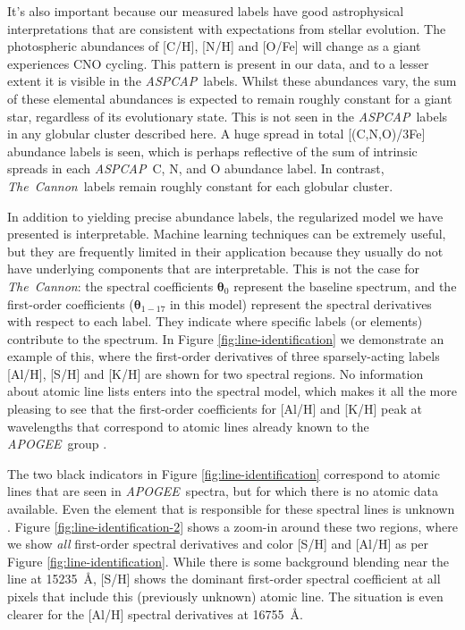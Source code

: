 \documentclass[12pt,preprint]{aastex}
\newcommand{\project}[1]{\textsl{#1}}
\newcommand{\TheCannon}{\project{The~Cannon}}
\newcommand{\acronym}[1]{{\small{#1}}}
\newcommand{\apogee}{\project{\acronym{APOGEE}}}
\newcommand{\aspcap}{\project{\acronym{ASPCAP}}}
\newcommand{\Dvector}[1]{\boldsymbol{#1}}
\newcommand{\vectheta}{\Dvector{\theta}}
\begin{document}
It's also important because our measured labels have good astrophysical
interpretations that are consistent with expectations from stellar
evolution.  The photospheric abundances of [C/H], [N/H] and [O/Fe] 
will change as a giant experiences CNO cycling.  This pattern is
present in our data, and to a lesser extent it is visible in the
\aspcap\ labels.  Whilst these abundances vary, the sum of these
elemental abundances is expected to remain roughly constant for a
giant star, regardless of its evolutionary state.  This is not 
seen in the \aspcap\ labels in any globular cluster described here.  
A huge spread in total [(C,N,O)/3Fe] abundance labels is seen, 
which is perhaps reflective of the sum of intrinsic spreads in
each \aspcap\ C, N, and O abundance label.  In contrast, \TheCannon\
labels remain roughly constant for each globular cluster.


In addition to yielding precise abundance labels, the regularized model
we have presented is interpretable.  Machine learning techniques can be extremely
useful, but they are frequently limited in their application because they
usually do not have underlying components that are interpretable.  This is
not the case for \TheCannon: the spectral coefficients $\vectheta_0$
represent the baseline spectrum, and the first-order coefficients 
($\vectheta_{1-17}$ in this model) represent the spectral derivatives with
respect to each label.  They indicate where specific labels (or elements)
contribute to the spectrum.  In Figure \ref{fig:line-identification} we
demonstrate an example of this, where the first-order derivatives of three
sparsely-acting labels [Al/H], [S/H] and [K/H] are shown for two spectral
regions.  No information about atomic line lists enters into the spectral
model, which makes it all the more pleasing to see that the first-order
coefficients for [Al/H] and [K/H] peak at wavelengths that correspond to
atomic lines already known to the \apogee\ group \citep{Smith_2013}. 


The two black indicators in Figure \ref{fig:line-identification} correspond
to atomic lines that are seen in \apogee\ spectra, but for which there is
no atomic data available.  Even the element that
is responsible for these spectral lines is unknown \citep{Shetrone_2015}.
Figure \ref{fig:line-identification-2} shows a zoom-in around these
two regions, where we show \emph{all} first-order spectral derivatives and
color [S/H] and [Al/H] as per Figure \ref{fig:line-identification}.  While
there is some background blending near the line at 15235~\AA{}, [S/H] shows
the dominant first-order spectral coefficient at all pixels that include
this (previously unknown) atomic line.  The situation is even clearer for
the [Al/H] spectral derivatives at 16755~\AA{}.  
\end{document}
